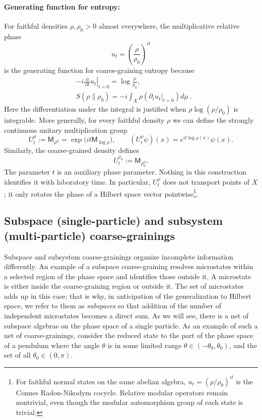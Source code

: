 \documentclass[a4paper,11pt]{article}
\theoremstyle{definition}
\newcommand{\dd}{\,\mathrm{d}}
\newcommand{\Mop}{\mathsf{M}}
\newcommand{\nn}{\nonumber}
\begin{document}
\paragraph{Generating function for entropy:} For faithful densities $\rho,\rho_0>0$ almost everywhere, the multiplicative relative phase
\[
u_t
=
\left(\frac{\rho}{\rho_0}\right)^{it}
\]
is the generating function for coarse-graining entropy because
\begin{align}
&-i\left.\frac{\dd}{\dd t}u_t\right|_{t=0}
=
\log\frac{\rho}{\rho_0},\nn\\
&S(\rho\|\rho_0)=-i \int_X \rho (\partial_t u_t\big|_{t=0})d\mu\ .
\end{align}
Here the differentiation under the integral is justified when $\rho\log(\rho/\rho_0)$ is integrable. More generally, for every faithful density $\rho$ we can define the strongly continuous unitary multiplication group
\[
  U_t^\rho:=\Mop_{\rho^{it}}
  =\exp\!\bigl(it\Mop_{\log\rho}\bigr),
  \qquad
  (U_t^\rho\psi)(x)=e^{it\log\rho(x)}\psi(x).
\]
Similarly, the coarse-grained density defines
\[
  U_t^{\rho_0}:=\Mop_{\rho_0^{it}}.
\]
The parameter $t$ is an auxiliary phase parameter. Nothing in this construction identifies it with laboratory time. In particular, $U_t^\rho$ does not transport points of $X$; it only rotates the phase of a Hilbert space vector pointwise\footnote{For faithful normal states on the same abelian algebra, $u_t=(\rho/\rho_0)^{it}$ is the Connes Radon-Nikodym cocycle. Relative modular operators remain nontrivial, even though the modular automorphism group of each state is trivial.}.

\subsection{Subspace (single-particle) and subsystem (multi-particle) coarse-grainings}
\label{subsec:classical-region-subsystem}

Subspace and subsystem coarse-grainings organize incomplete information differently. An example of a subspace coarse-graining resolves microstates within a selected region of the phase space and identifies those outside it. A microstate is either inside the coarse-graining region or outside it. The set of microstates adds up in this case; that is why, in anticipation of the generalization to Hilbert space, we refer to them as {\it subspaces} so that addition of the number of independent microstates becomes a direct sum. As we will see, there is a net of subspace algebras on the phase space of a single particle. As an example of such a net of coarse-grainings, consider the reduced state to the part of the phase space of a pendulum where the angle $\theta$ is in some limited range $\theta\in (-\theta_0,\theta_0)$, and the set of all $\theta_0\in (0,\pi)$.
\end{document}

